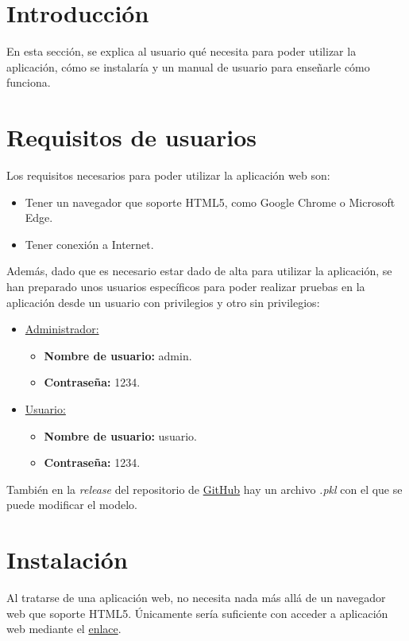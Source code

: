 
\section{Introducción}
En esta sección, se explica al usuario qué necesita para poder utilizar la aplicación, cómo se instalaría y un manual de usuario para enseñarle cómo funciona.

\section{Requisitos de usuarios} \label{requisitos}
Los requisitos necesarios para poder utilizar la aplicación web son:

\begin{itemize}
	\item Tener un navegador que soporte HTML5, como Google Chrome o Microsoft Edge.
	\item Tener conexión a Internet.
\end{itemize}

Además, dado que es necesario estar dado de alta para utilizar la aplicación, se han preparado unos usuarios específicos para poder realizar pruebas en la aplicación desde un usuario con privilegios y otro sin privilegios:

\begin{itemize}
	\item \underline{Administrador:} 
	\begin{itemize}
		\item \textbf{Nombre de usuario:} admin.
		\item \textbf{Contraseña:} 1234.
	\end{itemize}
	\item \underline{Usuario:}
	\begin{itemize}
		\item \textbf{Nombre de usuario:} usuario.
		\item \textbf{Contraseña:} 1234.
	\end{itemize}
\end{itemize}

También en la \textit{release} del repositorio de \href{https://github.com/xam1002/TFG_Deteccion_Parkinson}{GitHub} hay un archivo \textit{.pkl} con el que se puede modificar el modelo.

\section{Instalación}
Al tratarse de una aplicación web, no necesita nada más allá de un navegador web que soporte HTML5. Únicamente sería suficiente con acceder a aplicación web mediante el \href{http://tfg.identificacionparkinson.es:5000/}{enlace}.

